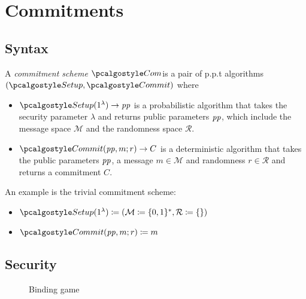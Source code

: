 \section{Commitments}\label{sec:commitments}

\subsection{Syntax}
\begin{definition}
  A \emph{commitment scheme} $\algo{Com}$is a pair of p.p.t algorithms $(\algo{Setup}, \algo{Commit})$ where
  \begin{itemize}
    \item $\algo{Setup}(1^\lambda) \rightarrow \params$ is a probabilistic algorithm that takes the security parameter $\lambda$ and returns public parameters $\mathit{pp}$, which include the message space $\mathcal{M}$ and the randomness space $\mathcal{R}$.
    \item $\algo{Commit}(\params, m; r) \rightarrow C$ is a deterministic algorithm that takes the public parameters $\mathit{pp}$, a message $m \in \mathcal{M}$ and randomness $r \in \mathcal{R}$ and returns a commitment $C$.
  \end{itemize}
\end{definition}

\begin{example}
  An example is the trivial commitment scheme\label{sec:trivial-com}:
  \begin{itemize}
    \item $\algo{Setup}(1^\lambda) \defeq (\mathcal{M} \defeq \{0, 1\}^*, \mathcal{R} \defeq \{\})$
    \item $\algo{Commit}(\params,m;r) \defeq m$
  \end{itemize}
\end{example}

\subsection{Security}

\begin{figure}[tbhp]
  \begin{center}
    \begin{tcolorbox}[width=8cm]
      \begin{pchstack}[center]
      \end{pchstack}
    \end{tcolorbox}
  \end{center}
  \caption{Binding game \label{fig:break-com-bind}}
\end{figure}

